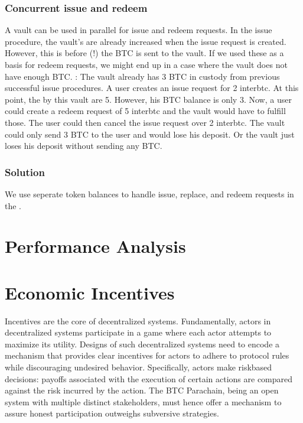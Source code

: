 \documentclass[a4paper,10pt,english]{sphinxmanual}
\begin{document}
\subsection{Concurrent issue and redeem}
\label{\detokenize{security_performance/security-analysis:concurrent-issue-and-redeem}}
A vault can be used in parallel for issue and redeem requests. In the issue procedure, the vault’s  are already increased when the issue request is created. However, this is before (!) the BTC is sent to the vault. If we used these  as a basis for redeem requests, we might end up in a case where the vault does not have enough BTC. : The vault already has 3 BTC in custody from previous successful issue procedures. A user creates an issue request for 2 interbtc. At this point, the  by this vault are 5. However, his BTC balance is only 3. Now, a user could create a redeem request of 5 interbtc and the vault would have to fulfill those. The user could then cancel the issue request over 2 interbtc. The vault could only send 3 BTC to the user and would lose his deposit. Or the vault just loses his deposit without sending any BTC.


\subsection{Solution}
\label{\detokenize{security_performance/security-analysis:solution}}
We use seperate token balances to handle issue, replace, and redeem requests in the {\hyperref[\detokenize{spec/vault-registry:vault-registry}]{}}.


\chapter{Performance Analysis}
\label{\detokenize{security_performance/performance:performance-analysis}}\label{\detokenize{security_performance/performance:id1}}\label{\detokenize{security_performance/performance::doc}}

\chapter{Economic Incentives}
\label{\detokenize{economics/incentives:economic-incentives}}\label{\detokenize{economics/incentives:incentives}}\label{\detokenize{economics/incentives::doc}}
Incentives are the core of decentralized systems. Fundamentally, actors in decentralized systems participate in a game where each actor attempts to maximize its utility. Designs of such decentralized systems need to encode a mechanism that provides clear incentives for actors to adhere to protocol rules while discouraging undesired behavior. Specifically, actors make risk\sphinxhyphen{}based decisions: payoffs associated with the execution of certain actions are compared against the risk incurred by the action. The BTC Parachain, being an open system with multiple distinct stakeholders, must hence offer a mechanism to assure honest participation outweighs subversive strategies.
\end{document}
